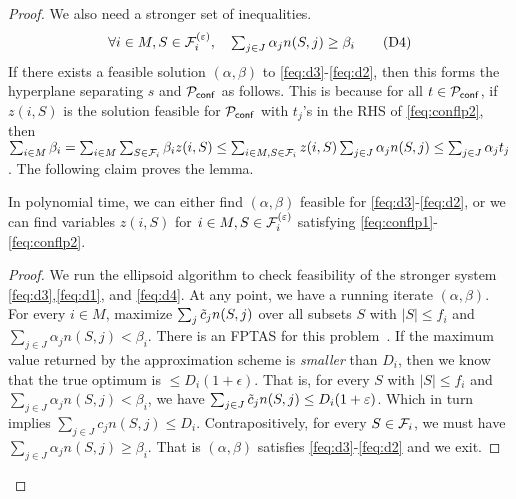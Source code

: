 \begin{proof}
We also need a stronger set of 	inequalities.
\begin{equation}\label{feq:d4}
 \textstyle \forall i\in M, S\in{\cal F}^{(\varepsilon)}_i, \quad \sum_{j\in J} \alpha_j n(S,j)  \geq \beta_i  \tag{D4}
\end{equation}
If there exists a feasible solution $(\alpha,\beta)$ to \eqref{feq:d3}-\eqref{feq:d2}, then this forms the hyperplane separating $s$ and ${\cal P}_\mathsf{conf}$ as follows.
This is because for all $t\in {\cal P}_\mathsf{conf}$, if  $z(i,S)$ is the solution feasible for ${\cal P}_\mathsf{conf}$ with $t_j$'s in the RHS of \eqref{feq:conflp2},
then $\sum_{i\in M}\beta_i = \sum_{i\in M} \sum_{S\in {\cal F}_i} \beta_i z(i,S) \leq \sum_{i\in M,S\in {\cal F}_i} z(i,S) \sum_{j\in J} \alpha_jn(S,j) \leq \sum_{j\in J} \alpha_j t_j$.
The following claim proves the lemma.\smallskip

\begin{claim}
In polynomial time, we can either find $(\alpha,\beta)$ feasible for \eqref{feq:d3}-\eqref{feq:d2}, or we can find variables $z(i,S)$ for $i\in M,S\in {\cal F}^{(\varepsilon)}_i$ satisfying
\eqref{feq:conflp1}-\eqref{feq:conflp2}.
\end{claim}
\begin{proof}
We run the ellipsoid algorithm to check feasibility of the stronger system \eqref{feq:d3},\eqref{feq:d1}, and \eqref{feq:d4}.
At any point, we have a running iterate $(\alpha,\beta)$. %
For every $i\in M$, maximize $\sum_j \tilde{c}_j n(S,j)$ over all subsets $S$ with $|S|\leq f_i$ and $\sum_{j\in J} \alpha_j n(S,j) < \beta_i$.
There is an FPTAS for this problem~\cite{CapraraKPP00}. If the maximum value returned by the approximation scheme is {\em smaller} than $D_i$, then
we know that the true optimum is $\leq D_i(1+\epsilon)$. That is, for every $S$ with $|S| \leq f_i$ and $\sum_{j\in J}\alpha_j n(S,j) < \beta_i$, we have $\sum_{j\in J} \tilde{c}_jn(S,j) \le D_i(1+\varepsilon)$.
Which in turn implies $\sum_{j\in J} c_jn(S,j) \leq D_i$. Contrapositively, for every $S\in {\cal F}_i$, we must have $\sum_{j\in J} \alpha_j n(S,j) \geq \beta_i$. %
That is $(\alpha,\beta)$ satisfies \eqref{feq:d3}-\eqref{feq:d2} and we exit.


\end{proof}
\end{proof}

